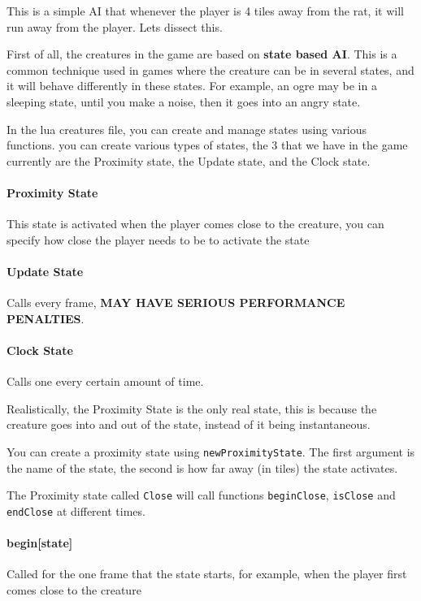 \documentclass{book}
\begin{document}
This is a simple AI that whenever the player is 4 tiles away from the rat, it will run away from the player. Lets dissect this.

First of all, the creatures in the game are based on \textbf{state based AI}. This is a common technique used in games where the creature can be in several states, and it will behave differently in these states. For example, an ogre may be in a sleeping state, until you make a noise, then it goes into an angry state.

In the lua creatures file, you can create and manage states using various functions. you can create various types of states, the 3 that we have in the game currently are the Proximity state, the Update state, and the Clock state.

\paragraph{Proximity State} This state is activated when the player comes close to the creature, you can specify how close the player needs to be to activate the state

\paragraph{Update State} Calls every frame, \textbf{MAY HAVE SERIOUS PERFORMANCE PENALTIES}.

\paragraph{Clock State} Calls one every certain amount of time.

Realistically, the Proximity State is the only real state, this is because the creature goes into and out of the state, instead of it being instantaneous.

You can create a proximity state using \texttt{newProximityState}. The first argument is the name of the state, the second is how far away (in tiles) the state activates.

The Proximity state called \texttt{Close} will call functions \texttt{beginClose}, \texttt{isClose} and \texttt{endClose} at different times.

\paragraph{begin[state]} Called for the one frame that the state starts, for example, when the player first comes close to the creature
\end{document}
